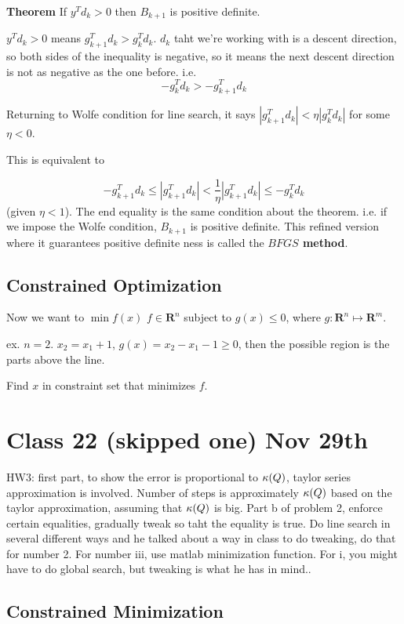 \textbf{Theorem} If $y^Td_k > 0$ then $B_{k+1}$ is positive definite.

 $y^Td_k>0$ means $g_{k+1}^Td_k > g_k^Td_k$. $d_k$ taht we're working
 with is a descent direction, so both sides of the inequality is
 negative, so it means the next descent direction is not as negative as
 the one before. i.e. $$-g_k^Td_k > -g_{k+1}^Td_k$$

Returning to Wolfe condition for line search, it says $|g_{k+1}^Td_k |<
\eta |g_k^Td_k|$ for some $\eta < 0$.

This is equivalent to

$$-g_{k+1}^Td_k \le |g_{k+1}^Td_k| < \frac{1}{\eta}|g_{k+1}^Td_k| \le
-g_k^Td_k$$
(given $\eta < 1$). The end equality is the same condition about the theorem. i.e. if we
impose the Wolfe condition, $B_{k+1}$ is positive definite.
This refined version where it guarantees positive definite ness is
called the \textbf{$BFGS$ method}.

\subsection{Constrained Optimization}
\label{sec:constrainedoptimization}

Now we want to $ \min f(x)$ $f\in \mathbf{R}^n$ subject to $g(x)
\le 0$, where $g: \mathbf{R}^n \mapsto \mathbf{R}^m$.

ex. $n=2$. $x_2 = x_1+1$, $g(x) = x_2 - x_1 - 1 \ge 0$, then the
possible region is the parts above the line. 

Find $x$ in constraint set that minimizes $f$.

\section{Class 22 (skipped one) Nov 29th}
HW3: first part, to show the error is proportional to $\kappa(Q)$,
taylor series approximation is involved. Number of steps is
approximately $\kappa(Q)$ based on the taylor approximation, assuming
that $\kappa(Q)$ is big. Part b of problem 2, enforce certain
equalities, gradually tweak so taht the equality is true. Do line
search in several different ways and he talked about a way in class to
do tweaking, do that for number 2. For number iii, use matlab
minimization function. For i, you might have to do global search, but
tweaking is what he has in mind..

\subsection{Constrained Minimization}

